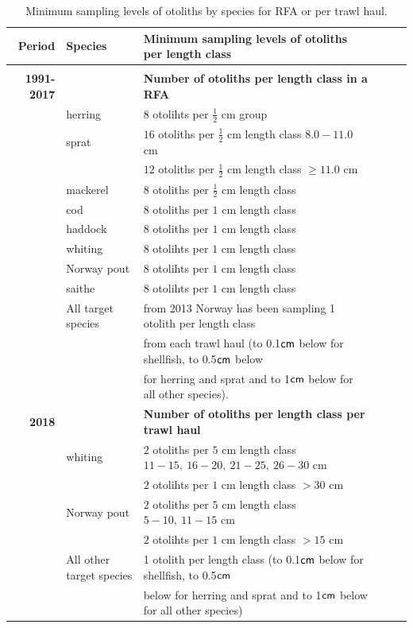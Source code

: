 \documentclass[a4paper 12pt]{article}
\numberwithin{equation}{section}
\newcommand{\cm}{\textnormal{\sffamily cm}\xspace}
\begin{document}
\begin{table}[h!]
\centering
\caption{Minimum sampling levels of otoliths by species for RFA or per trawl haul.}
\label{otolithsTable}
\begin{tabularx}{\linewidth}{r l l l l X}
\toprule 
Period &  Species  & Minimum sampling levels of otoliths per length class    \\[0.7ex]
\midrule \\[0.5ex]
{\bf 1991-2017} & & {\bf Number of otoliths per length class in a RFA}  \\[1.8ex]
     & herring  &  $8$  otolihts per $\frac{1}{2}$ cm group \\[0.8ex]
     & sprat    & $16$  otoliths per $\frac{1}{2}$ cm length class  $8.0 -11.0$ cm\\[0.8ex]
              & & $12$  otoliths per $\frac{1}{2}$ cm length class  $\geq 11.0$ cm\\[0.8ex]
& mackerel      & $8$  otoliths per $\frac{1}{2}$ cm length class \\[0.8ex]
& cod       	  & $8$  otoliths per $1$ cm length class\\[0.8ex]
&haddock   	  & $8$  otoliths per $1$ cm length class \\[0.8ex]
&whiting    	  & $8$  otolihts per $1$ cm length class \\[0.8ex]
&Norway pout   & $8$  otolihts per $1$ cm length class\\[0.8ex]
&saithe        & $8$  otolihts per $1$ cm length class \\[2ex] 

& All target species      & from 2013 Norway has been sampling 1 otolith per length class  \\[0.7ex] 
&& from each trawl haul (to 0.1$\cm$ below for shellfish, to 0.5$\cm$ below  \\[0.7ex] 
&& for herring and sprat and to 1$\cm$ below for all other species).\\[2.7ex] 

{\bf 2018} & & {\bf Number of otoliths per length class per trawl haul}  \\[1.8ex]
& whiting & $2$  otoliths per $5$ cm length class $11 -15, \ 16-20, \ 21-25, \ 26-30$ cm \\[1.8ex]
             & & $2$  otolihts per $1$ cm length class $> 30$ cm\\[1.5ex]
 & Norway pout & $2$  otoliths per $5$ cm length class $5 -10, \ 11-15$ cm\\[0.8ex]
               & & $2$  otolihts per $1$ cm length class $> 15$ cm\\[1.8ex]
 & All other target species  &  1 otolith per length class (to 0.1$\cm$   below for shellfish, to 0.5$\cm$ \\[0.8ex]
 && below for herring and sprat and to 1$\cm$ below for all other species)\\[0.7ex] 
\bottomrule         
\end{tabularx}
\end{table}
\end{document}
